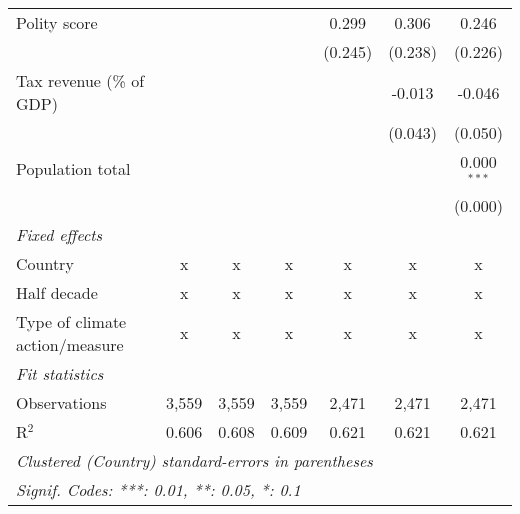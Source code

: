 \begin{tabular}{lcccccc}
   Polity score                                                 &             &                &                & 0.299          & 0.306          & 0.246\\   
                                                                &             &                &                & (0.245)        & (0.238)        & (0.226)\\   
   Tax revenue (\% of GDP)                                      &             &                &                &                & -0.013         & -0.046\\   
                                                                &             &                &                &                & (0.043)        & (0.050)\\   
   Population total                                             &             &                &                &                &                & 0.000$^{***}$\\   
                                                                &             &                &                &                &                & (0.000)\\   
   \emph{Fixed effects}\\
   Country                                                      & x           & x              & x              & x              & x              & x\\  
   Half decade                                                  & x           & x              & x              & x              & x              & x\\  
   Type of climate action/measure                               & x           & x              & x              & x              & x              & x\\  
   \midrule \emph{Fit statistics}\\
   Observations                                                 & 3,559       & 3,559          & 3,559          & 2,471          & 2,471          & 2,471\\  
   R$^2$                                                        & 0.606       & 0.608          & 0.609          & 0.621          & 0.621          & 0.621\\  
   \midrule
   \multicolumn{7}{l}{\emph{Clustered (Country) standard-errors in parentheses}}\\
   \multicolumn{7}{l}{\emph{Signif. Codes: ***: 0.01, **: 0.05, *: 0.1}}\\
\end{tabular}
\par\endgroup


